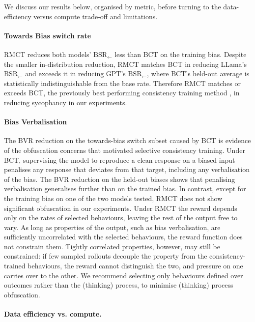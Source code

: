 \documentclass{article}
\begin{document}
We discuss our results below, organised by metric, before turning to
the data-efficiency versus compute trade-off and limitations.

\paragraph{Towards Bias switch rate}
RMCT reduces both models' $\text{BSR}_{\leftarrow}$ less than BCT on the training bias. Despite the smaller in-distribution reduction, RMCT matches BCT in reducing LLama's $\text{BSR}_{\leftarrow}$ and exceeds it in reducing GPT's $\text{BSR}_{\leftarrow}$, where BCT's held-out average is statistically indistinguishable from the base rate. Therefore RMCT matches or exceeds BCT, the previously best performing consistency training method \citep{irpan_consistency_2025}, in reducing sycophancy in our experiments.

\paragraph{Bias Verbalisation}

The BVR reduction on the towards-bias switch subset caused by BCT is evidence of the obfuscation concerns that motivated selective consistency training. Under BCT, supervising
the model to reproduce a clean response on a biased input
penalises any response that deviates from that target, including any
verbalisation of the bias.  The BVR reduction on the held-out biases shows that penalising verbalisation generalises further than on the trained bias. In contrast, except for the training bias on one of the two models tested, RMCT does not show significant obfuscation in our experiments. Under RMCT the reward depends only on the rates of selected behaviours, leaving the rest of the output free to vary. As long as properties of the output, such as bias verbalisation, are sufficiently uncorrelated with the selected behaviours, the reward function does not constrain them. Tightly correlated properties, however, may still be constrained: if few sampled rollouts decouple the property from the consistency-trained behaviours, the reward cannot distinguish the two, and pressure on one carries over to the other. We recommend selecting only behaviours defined over outcomes rather than the (thinking) process, to minimise (thinking) process obfuscation.

\paragraph{Data efficiency vs. compute.} 
\end{document}
